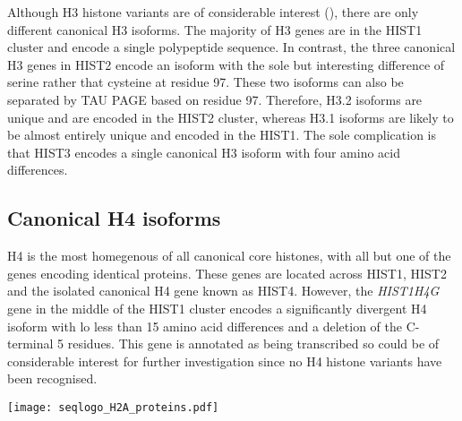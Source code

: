 	Although H3 histone variants are of considerable interest (), 
	there are only \HThreeUniqueProteins{} different canonical H3 isoforms. 
	The majority of H3 genes are in the HIST1 cluster 
	and encode a single polypeptide sequence. 
	In contrast, the three canonical H3 genes in HIST2 encode an isoform 
	with the sole but interesting difference of serine rather that cysteine at residue 97.
	These two isoforms can also be separated by TAU PAGE based on residue 97. 
	Therefore, H3.2 isoforms are unique and are encoded in the HIST2 cluster, 
	whereas H3.1 isoforms are likely to be almost entirely unique and encoded in the HIST1. 
	The sole complication is that HIST3 encodes a single canonical H3 isoform 
	with four amino acid differences.
	
  \subsection{Canonical H4 isoforms}
	H4 is the most homegenous of all canonical core histones, 
	with all but one of the \HFourCodingGenes{} genes encoding identical proteins. 
	These genes are located across HIST1, HIST2 
	and the isolated canonical H4 gene known as HIST4.
	However, the \textit{HIST1H4G} gene in the middle of the HIST1 cluster 
	encodes a significantly divergent H4 isoform 
	with lo less than 15 amino acid differences and a deletion of the C-terminal 5 residues. 
	This gene is annotated as being transcribed 
	so could be of considerable interest for further investigation 
	since no H4 histone variants have been recognised.


  \begin{TableAndFigure*}
    \label{tab:H2A-consensus}
    

    \texttt{[image: seqlogo\_H2A\_proteins.pdf]}
    \label{fig:H2A-weblogo}
  \end{TableAndFigure*}

